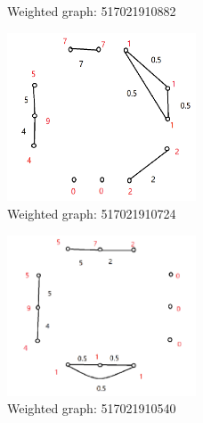 \documentclass[12pt,a4]{article}
\begin{document}
\begin{exercise}
\begin{solution}
\begin{figure}[!htb]
      \caption{Weighted graph: 517021910882}
  \end{figure}
  \begin{figure}[!htb]
     	 \centering
      	\includegraphics[width=0.5\textwidth]{p724.png}
      	\caption{Weighted graph: 517021910724}
  \end{figure}
  \begin{figure}[!htb]
      \centering
      \includegraphics[width=0.5\textwidth]{p540.png}
      \caption{Weighted graph: 517021910540}
  \end{figure}
\end{solution}
\end{exercise}
\end{document}
